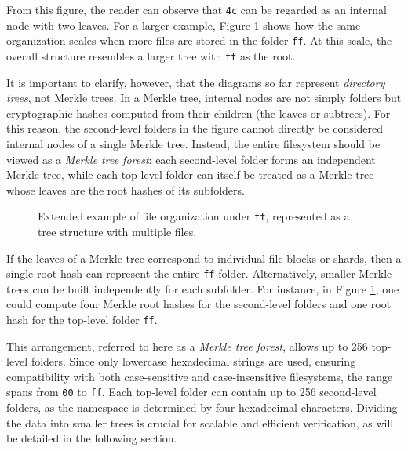 From this figure, the reader can observe that \texttt{4c} can be regarded as an internal node with two leaves. For a larger example, Figure \ref{fig:file-organization-example-in-tree-2} shows how the same organization scales when more files are stored in the folder \texttt{ff}. At this scale, the overall structure resembles a larger tree with \texttt{ff} as the root.  

It is important to clarify, however, that the diagrams so far represent \emph{directory trees}, not Merkle trees. In a Merkle tree, internal nodes are not simply folders but cryptographic hashes computed from their children (the leaves or subtrees). For this reason, the second-level folders in the figure cannot directly be considered internal nodes of a single Merkle tree. Instead, the entire filesystem should be viewed as a \emph{Merkle tree forest}: each second-level folder forms an independent Merkle tree, while each top-level folder can itself be treated as a Merkle tree whose leaves are the root hashes of its subfolders.

\begin{figure}[h]
\centering
{}
\caption{Extended example of file organization under \texttt{ff}, represented as a tree structure with multiple files.}
\label{fig:file-organization-example-in-tree-2}
\end{figure}

If the leaves of a Merkle tree correspond to individual file blocks or shards, then a single root hash can represent the entire \texttt{ff} folder. Alternatively, smaller Merkle trees can be built independently for each subfolder. For instance, in Figure \ref{fig:file-organization-example-in-tree-2}, one could compute four Merkle root hashes for the second-level folders and one root hash for the top-level folder \texttt{ff}.

This arrangement, referred to here as a \emph{Merkle tree forest}, allows up to 256 top-level folders. Since only lowercase hexadecimal strings are used, ensuring compatibility with both case-sensitive and case-insensitive filesystems, the range spans from \texttt{00} to \texttt{ff}. Each top-level folder can contain up to 256 second-level folders, as the namespace is determined by four hexadecimal characters. Dividing the data into smaller trees is crucial for scalable and efficient verification, as will be detailed in the following section.

